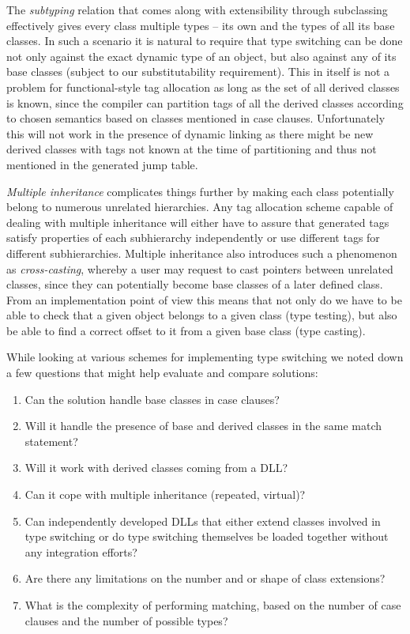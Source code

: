\documentclass[preprint]{sigplanconf}
\begin{document}

The \emph{subtyping} relation that comes along with extensibility through 
subclassing effectively gives every class multiple types -- its own and the 
types of all its base classes. In such a scenario it is natural to require that 
type switching can be done not only against the exact dynamic type of an object, 
but also against any of its base classes (subject to our substitutability 
requirement). This in itself is not a problem for functional-style tag 
allocation as long as the set of all derived classes is known, since the 
compiler can partition tags of all the derived classes according to chosen 
semantics based on classes mentioned in case clauses.
Unfortunately this will not work in the presence of dynamic linking as there 
might be new derived classes with tags not known at the time of partitioning and 
thus not mentioned in the generated jump table.

\emph{Multiple inheritance} complicates things further by making each class 
potentially belong to numerous unrelated hierarchies. Any tag allocation scheme 
capable of dealing with multiple inheritance will either have to assure that 
generated tags satisfy properties of each subhierarchy independently or use 
different tags for different subhierarchies. Multiple inheritance also 
introduces such a phenomenon as \emph{cross-casting}, whereby a user may request 
to cast pointers between unrelated classes, since they can potentially become 
base classes of a later defined class. From an implementation point of view this 
means that not only do we have to be able to check that a given object belongs 
to a given class (type testing), but also be able to find a correct offset to it 
from a given base class (type casting).

While looking at various schemes for implementing type switching we noted down a 
few questions that might help evaluate and compare solutions: 

\begin{enumerate}
\setlength{\itemsep}{0pt}
\setlength{\parskip}{0pt}
\item Can the solution handle base classes in case clauses?
\item Will it handle the presence of base and derived classes in the same match statement?
\item Will it work with derived classes coming from a DLL?
\item Can it cope with multiple inheritance (repeated, virtual)?
\item Can independently developed DLLs that either extend classes involved in 
      type switching or do type switching themselves be loaded together without 
      any integration efforts?
\item Are there any limitations on the number and or shape of class extensions?
\item What is the complexity of performing matching, based on the number of case clauses and 
      the number of possible types?
\end{enumerate}
\end{document}
